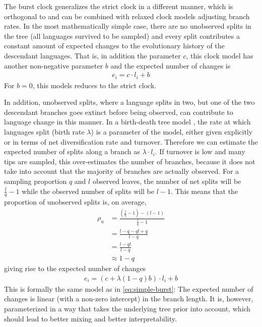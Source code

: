 \documentclass[a4paper,12pt]{scrartcl}
\begin{document}
The burst clock generalizes the strict clock in a different manner, which is
orthogonal to and can be combined with relaxed clock models adjusting branch
rates. In the most mathematically simple case, there are no unobserved splits in
the tree (all languages survived to be sampled) and every split contributes a
constant amount of expected changes to the evolutionary history of the
descendant languages. That is, in addition the parameter $c$, this clock model
has another non-negative parameter $b$ and the expected number of changes is
\begin{align}
  e_i = c \cdot l_i + b
  \label{eq:simple-burst}
\end{align}
For $b=0$, this models reduces to the strict clock.

%

In addition, unobserved splits, where a language splits in two, but one of
the two descendant branches goes extinct before being observed, can contribute
to language change in this manner. In a birth-death tree model \parencite{}, the rate at which
languages split (birth rate $\lambda$) is a parameter of the model, either given explicitly or in terms of net diversification rate and turnover. Therefore
we can estimate the expected number of splits along a branch as $\lambda \cdot
l_i$. If turnover is low and many tips are sampled, this over-estimates the number of branches, because it does not take into account that the majority of branches are actually observed. For a sampling proportion $q$ and $l$ observed leaves, the number of net splits will be
$\frac{l}{q} - 1$
while the observed number of splits will be $l - 1$. This means that the proportion of unobserved splits is, on average,
\begin{align}
    \rho_u &= \frac{(\frac{l}{q} - 1) - (l - 1)}{\frac{l}{q} -1} \\
    & = \frac{l - q - ql + q}{l - q} \\
    & = \frac{l - ql}{l - q} \\
    & \approx 1 - q
\end{align}
giving rise to the expected number of changes
\begin{align}
  e_i = (c + \lambda (1-q) b) \cdot l_i + b
  \label{eq:reparam-burst}
\end{align}
This is formally the same model as in \cref{eq:simple-burst}: The expected number of changes is linear (with a non-zero intercept) in the branch length. It is, however, parameterized
in a way that takes the underlying tree prior into account,
which should lead to better mixing and better interpretability.
\end{document}
